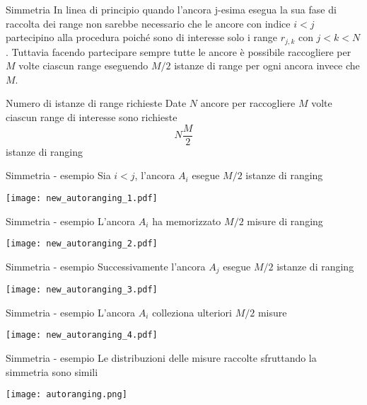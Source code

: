 \begin{frame}{Simmetria}
  In linea di principio quando l'ancora j-esima esegua la sua fase di raccolta dei range non sarebbe
  necessario che le ancore con indice $i < j$ partecipino alla procedura poiché sono di interesse solo
  i range $r_{j,k}$ con $j < k < N$. Tuttavia facendo partecipare sempre tutte le ancore è possibile
  raccogliere per $M$ volte ciascun range eseguendo $M/2$ istanze di range per ogni ancora invece che $M$.

  \begin{exampleblock}{Numero di istanze di range richieste}
    Date $N$ ancore per raccogliere $M$ volte ciascun range di interesse sono richieste
    \[
    N \frac{M}{2}
    \]
    istanze di ranging
  \end{exampleblock}
\end{frame}

\begin{frame}{Simmetria - esempio}
  Sia $i<j$, l'ancora $A_i$ esegue $M/2$ istanze di ranging
  \begin{center}
    \texttt{[image: new\_autoranging\_1.pdf]}
  \end{center}
\end{frame}

\begin{frame}{Simmetria - esempio}
  L'ancora $A_i$ ha memorizzato $M/2$ misure di ranging
  \begin{center}
    \texttt{[image: new\_autoranging\_2.pdf]}
  \end{center}
\end{frame}

\begin{frame}{Simmetria - esempio}
  Successivamente l'ancora $A_j$ esegue $M/2$ istanze di ranging
  \begin{center}
    \texttt{[image: new\_autoranging\_3.pdf]}
  \end{center}
\end{frame}

\begin{frame}{Simmetria - esempio}
  L'ancora $A_i$ colleziona ulteriori $M/2$ misure
  \begin{center}
    \texttt{[image: new\_autoranging\_4.pdf]}
  \end{center}
\end{frame}

\begin{frame}{Simmetria - esempio}
  Le distribuzioni delle misure raccolte sfruttando la simmetria sono simili 
  \begin{center}
    \texttt{[image: autoranging.png]}
  \end{center}
\end{frame}

